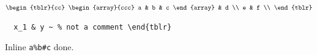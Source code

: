 $\begin{tblr}{cc} \begin{array}{ccc} a & b & c \end{array} & d \\ e & f \\ \end{tblr}$

\begin{verbatim}
  x_1 & y ~ % not a comment \end{tblr}
\end{verbatim}
Inline \verb|a%b#c| done.

